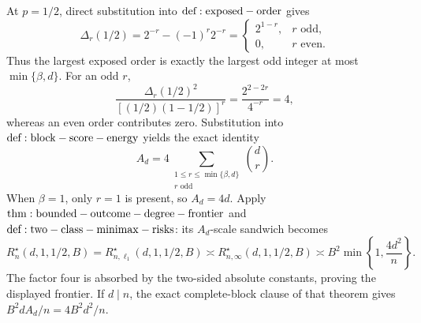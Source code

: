 At \(p=1/2\), direct substitution into \({\rm def:exposed-order}\) gives
\[
\Delta_r(1/2)=2^{-r}-(-1)^r2^{-r}
=\begin{cases}2^{1-r},&r\text{ odd},\\0,&r\text{ even}.\end{cases}
\]
Thus the largest exposed order is exactly the largest odd integer at most \(\min\{\beta,d\}\). For an odd \(r\),
\[
\frac{\Delta_r(1/2)^2}{[(1/2)(1-1/2)]^r}
=\frac{2^{2-2r}}{4^{-r}}=4,
\]
whereas an even order contributes zero. Substitution into \({\rm def:block-score-energy}\) yields the exact identity
\[
A_d=4\sum_{\substack{1\le r\le\min\{\beta,d\}\\r\text{ odd}}}\binom dr.
\]
When \(\beta=1\), only \(r=1\) is present, so \(A_d=4d\). Apply \({\rm thm:bounded-outcome-degree-frontier}\) and \({\rm def:two-class-minimax-risks}\): its \(A_d\)-scale sandwich becomes
\[
R_n^\star(d,1,1/2,B)=R_{n,\ell_1}^\star(d,1,1/2,B)
\asymp R_{n,\infty}^\star(d,1,1/2,B)
\asymp B^2\min\!\left\{1,\frac{4d^2}{n}\right\}.
\]
The factor four is absorbed by the two-sided absolute constants, proving the displayed frontier. If \(d\mid n\), the exact complete-block clause of that theorem gives \(B^2dA_d/n=4B^2d^2/n\).